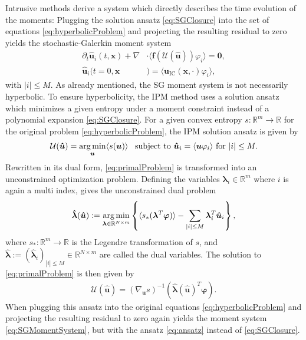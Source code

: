 Intrusive methods derive a system which directly describes the time evolution of the moments: Plugging the solution ansatz \eqref{eq:SGClosure} into the set of equations \eqref{eq:hyperbolicProblem} and projecting the resulting residual to zero yields the stochastic-Galerkin moment system
\begin{subequations}\label{eq:SGMomentSystem}
\begin{align}
\partial_t \bm{\hat u}_i(t,\bm{x}) + \nabla&\cdot\langle\bm{f}(\mathcal{U}(\bm{\hat u})) \varphi_i\rangle = \bm{0}, \\
\bm{\hat u}_i(t=0,\bm{x}&) = \langle\bm{u}_{\text{IC}}(\bm{x},\cdot)\varphi_i\rangle,
\end{align}
\end{subequations}
with $|i|\leq M$. As already mentioned, the SG moment system is not necessarily hyperbolic. To ensure hyperbolicity, the IPM method uses a solution ansatz which minimizes a given entropy under a moment constraint instead of a polynomial expansion \eqref{eq:SGClosure}. For a given convex entropy $s:\mathbb{R}^m\to\mathbb{R}$ for the original problem \eqref{eq:hyperbolicProblem}, the IPM solution ansatz is given by
\begin{align}\label{eq:primalProblem}
\mathcal{U}(\bm{\hat u}) = \operatorname*{arg\,min}_{\bm u} \langle s(\bm u) \rangle \enskip \text{ subject to } \bm{\hat u}_i = \langle \bm u \varphi_i \rangle \text{ for } |i| \leq M.
\end{align}
Rewritten in its dual form, \eqref{eq:primalProblem} is transformed into an unconstrained optimization problem. Defining the variables $\bm{\lambda}_i\in\mathbb{R}^m$ where $i$ is again a multi index, gives the unconstrained dual problem
\begin{align}\label{eq:dualProblem}
 \bm{\hat \lambda}(\bm{\hat u}) := \operatorname*{arg\,min}_{\bm{\lambda} \in \mathbb{R}^{N \times m}}
  \left\{\langle s_*(\bm{\lambda}^T \bm\varphi)\rangle - \sum_{|i|\leq M}\bm{\lambda}_i^T \bm{\hat u}_i\right\},
\end{align}
where $s_*:\mathbb{R}^m\to\mathbb{R}$ is the Legendre transformation of $s$, and $\bm{ \hat\lambda}:=(\bm{\hat{\lambda}}_i)_{|i|\leq M}\in \mathbb{R}^{N \times m}$ are called the dual variables. The solution to \eqref{eq:primalProblem} is then given by
\begin{align}\label{eq:ansatz}
 \mathcal{U}(\bm{\hat u}) = \left( \nabla_{\bm{u}} s \right)^{-1}(\bm{\hat{\lambda}}(\bm{\hat u})^T \bm{\varphi}).
\end{align}
When plugging this ansatz into the original equations \eqref{eq:hyperbolicProblem} and projecting the resulting residual to zero again yields the moment system \eqref{eq:SGMomentSystem}, but with the ansatz \eqref{eq:ansatz} instead of \eqref{eq:SGClosure}.



